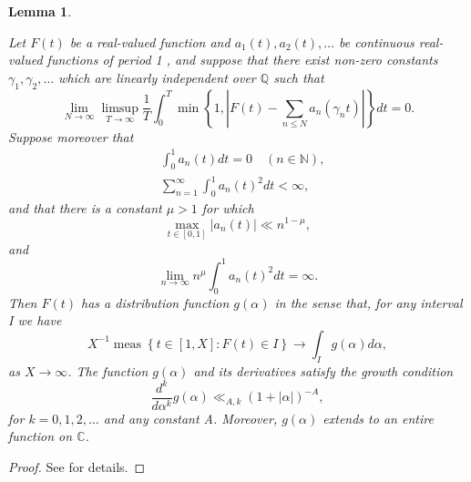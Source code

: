 \documentclass[10pt,leqno]{amsart}
\numberwithin{equation}{section}
\newtheorem{lemma}[definition]{{Lemma}}
\begin{document}
\begin{lemma}\label{le5.1}

Let $F(t)$ be a real-valued function and $a_1(t), a_2(t), \ldots$ be continuous real-valued functions of period 1 , and suppose that there exist non-zero constants $\gamma_1, \gamma_2, \ldots$ which are linearly independent over $\mathbb{Q}$ such that
\[
\lim _{N \rightarrow \infty} \limsup _{T \rightarrow \infty} \frac{1}{T} \int_0^T \min \left\{1,\left|F(t)-\sum_{n \leqslant N} a_n\left(\gamma_n t\right)\right|\right\} d t=0.
\]
 Suppose moreover that
\[
\begin{aligned}
& \int_0^1 a_n(t) d t=0 \quad(n \in \mathbb{N}), \\
& \sum_{n=1}^{\infty} \int_0^1 a_n(t)^2 d t<\infty,
\end{aligned}
\]
and that there is a constant $\mu>1$ for which
\[
\max _{t \in[0,1]}\left|a_n(t)\right| \ll n^{1-\mu},
\]
and
\[
\lim _{n \rightarrow \infty} n^\mu \int_0^1 a_n(t)^2 d t=\infty.
\]
Then $F(t)$ has a distribution function $g(\alpha)$  in the sense that, for any interval I we have
\[
X^{-1} \operatorname{meas}\left\{t \in[1, X]: F(t) \in I\right\} \rightarrow \int_I g(\alpha) d \alpha,
\]
as $X \rightarrow \infty$. The function $g(\alpha)$ and its derivatives satisfy the growth condition
\[
\frac{d^k}{d \alpha^k} g(\alpha) \ll_{A, k}(1+|\alpha|)^{-A},
\]
for $k=0,1,2, \ldots$ and any constant A. Moreover, $g(\alpha)$ extends to an entire function on $\mathbb{C}$.
\end{lemma}
\begin{proof}
    See \cite[Theorem 5]{MR1159354} for details.
\end{proof}
\end{document}
